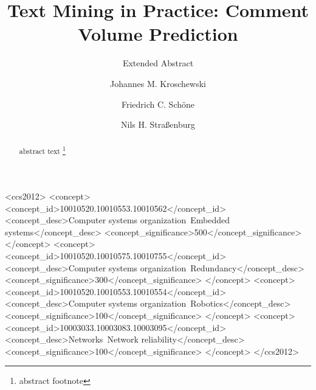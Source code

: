 \documentclass[10pt,sigconf]{acmart}
\begin{document}
\title{Text Mining in Practice: Comment Volume Prediction}
\subtitle{Extended Abstract} %

\author{Johannes M. Kroschewski}

\author{Friedrich C. Schöne}

\author{Nils H. Straßenburg}

\renewcommand{\shortauthors}{M. Kroschewski et al.}


\begin{abstract}
	abstract text \footnote{abstract footnote}
\end{abstract}
%
%
\begin{CCSXML}
<ccs2012>
 <concept>
  <concept_id>10010520.10010553.10010562</concept_id>
  <concept_desc>Computer systems organization~Embedded systems</concept_desc>
  <concept_significance>500</concept_significance>
 </concept>
 <concept>
  <concept_id>10010520.10010575.10010755</concept_id>
  <concept_desc>Computer systems organization~Redundancy</concept_desc>
  <concept_significance>300</concept_significance>
 </concept>
 <concept>
  <concept_id>10010520.10010553.10010554</concept_id>
  <concept_desc>Computer systems organization~Robotics</concept_desc>
  <concept_significance>100</concept_significance>
 </concept>
 <concept>
  <concept_id>10003033.10003083.10003095</concept_id>
  <concept_desc>Networks~Network reliability</concept_desc>
  <concept_significance>100</concept_significance>
 </concept>
</ccs2012>  
\end{CCSXML}

\end{document}
